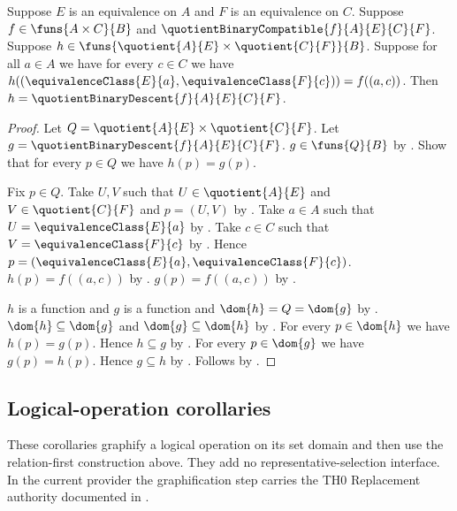 \begin{theorem}\label{quotient_binary_descent_unique}
    Suppose $E$ is an equivalence on $A$ and
        $F$ is an equivalence on $C$.
    Suppose $f\in\funs{A\times C}{B}$ and
        $\quotientBinaryCompatible{f}{A}{E}{C}{F}$.
    Suppose $h\in
        \funs{\quotient{A}{E}\times\quotient{C}{F}}{B}$.
    Suppose for all $a\in A$ we have for every $c\in C$ we have
        $h((\equivalenceClass{E}{a},\equivalenceClass{F}{c}))
            =f((a,c))$.
    Then $h=\quotientBinaryDescent{f}{A}{E}{C}{F}$.
\end{theorem}
\begin{proof}
    Let $Q=\quotient{A}{E}\times\quotient{C}{F}$.
    Let $g=\quotientBinaryDescent{f}{A}{E}{C}{F}$.
    $g\in\funs{Q}{B}$ by .
    Show that for every $p\in Q$ we have $h(p)=g(p)$.
    \begin{subproof}
        Fix $p\in Q$.
        Take $U,V$ such that $U\in\quotient{A}{E}$ and
            $V\in\quotient{C}{F}$ and $p=(U,V)$ by
            .
        Take $a\in A$ such that
            $U=\equivalenceClass{E}{a}$ by .
        Take $c\in C$ such that
            $V=\equivalenceClass{F}{c}$ by .
        Hence
            $p=(\equivalenceClass{E}{a},\equivalenceClass{F}{c})$.
        $h(p)=f((a,c))$ by \auto.
        $g(p)=f((a,c))$ by .
    \end{subproof}
    $h$ is a function and $g$ is a function and $\dom{h}=Q=\dom{g}$ by
        .
    $\dom{h}\subseteq\dom{g}$ and $\dom{g}\subseteq\dom{h}$ by
        .
    For every $p\in\dom{h}$ we have $h(p)=g(p)$.
    Hence $h\subseteq g$ by .
    For every $p\in\dom{g}$ we have $g(p)=h(p)$.
    Hence $g\subseteq h$ by .
    Follows by .
\end{proof}

\subsection{Logical-operation corollaries}

These corollaries graphify a logical operation on its set domain and then use
the relation-first construction above.  They add no representative-selection
interface.  In the current provider the graphification step carries the TH0
Replacement authority documented in .

